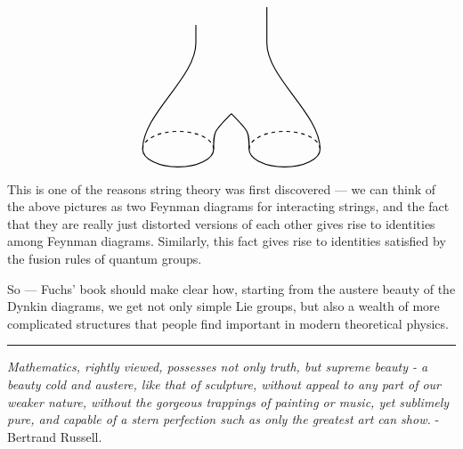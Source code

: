 \documentclass{article}
\begin{document}
\begin{enumerate}
\[\begin{tikzpicture}[scale=0.5]
\begin{scope}
         \draw[thick] (2,-6) to (2,-7);
       \end{scope}
       \begin{scope}[rotate=180,shift={(0,14)}]
         \begin{scope}[shift={(-3,0)},rotate=180]
           \draw[thick,dashed] (0:2cm and 1cm) arc (0:180:2cm and 1cm);
           \draw[thick] (180:2cm and 1cm) arc (180:360:2cm and 1cm);
         \end{scope}
         \begin{scope}[shift={(3,0)},rotate=180]
           \draw[thick,dashed] (0:2cm and 1cm) arc (0:180:2cm and 1cm);
           \draw[thick] (180:2cm and 1cm) arc (180:360:2cm and 1cm);
         \end{scope}
         \draw[thick] (-5,0) .. controls (-5,-2) and (-2,-4) .. (-2,-6);
         \draw[thick] (5,0) .. controls (5,-2) and (2,-4) .. (2,-6);
         \draw[thick] (-1,0) .. controls (-1,-1) .. (0,-2);
         \draw[thick] (1,0) .. controls (1,-1) .. (0,-2);
         \draw[thick] (-2,-6) to (-2,-7);
         \draw[thick] (2,-6) to (2,-7);
       \end{scope}
     \end{tikzpicture}
   \] This is one of the reasons string theory was first discovered ---
  we can think of the above pictures as two Feynman diagrams for
  interacting strings, and the fact that they are really just distorted
  versions of each other gives rise to identities among Feynman
  diagrams. Similarly, this fact gives rise to identities satisfied by
  the fusion rules of quantum groups.
\end{enumerate}

So --- Fuchs' book should make clear how, starting from the austere
beauty of the Dynkin diagrams, we get not only simple Lie groups, but
also a wealth of more complicated structures that people find important
in modern theoretical physics.

\begin{center}\rule{0.5\linewidth}{0.5pt}\end{center}

\emph{Mathematics, rightly viewed, possesses not only truth, but supreme
beauty - a beauty cold and austere, like that of sculpture, without
appeal to any part of our weaker nature, without the gorgeous trappings
of painting or music, yet sublimely pure, and capable of a stern
perfection such as only the greatest art can show.} - Bertrand Russell.
\end{document}
